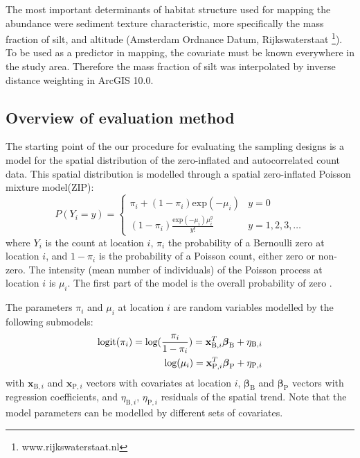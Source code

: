 \documentclass[review]{elsarticle}
\newcommand{\xbf}{\ensuremath{\mathbf x}}
\begin{document}
The most important determinants of habitat structure used for mapping the abundance were sediment texture characteristic, more specifically the mass fraction of silt, and altitude (Amsterdam Ordnance Datum, Rijkswaterstaat \footnote{www.rijkswaterstaat.nl}). To be used as a predictor in mapping, the covariate must be known everywhere in the study area. Therefore the mass fraction of silt was interpolated by inverse distance weighting in ArcGIS 10.0. 

\subsection{Overview of evaluation method}
The starting point of the our procedure for evaluating the sampling designs is a model for the spatial distribution of the zero-inflated and autocorrelated count data. This spatial distribution is modelled through a spatial zero-inflated Poisson mixture model(ZIP)\citep{lambert1992, agarwal2002}:
\begin{equation}
    P(Y_i=y)=
\begin{cases}
\pi_i+(1-\pi_i)\text{exp}(-\mu_i) & y=0 \\
(1-\pi_i)\frac{\text{exp}(-\mu_i)\mu_i^{y}}{y!}& y=1,2,3,\ldots
\end{cases}
\end{equation}
where $Y_i$ is the count at location $i$, $\pi_i$ the probability of a Bernoulli zero at location $i$, and $1-\pi_i$ is the probability of a Poisson count, either zero or non-zero. The intensity (mean number of individuals) of the Poisson process at location $i$ is $\mu_i$. The first part of the model is the overall probability of zero \citep{hilbe2007}.

The parameters $\pi_i$ and $\mu_i$ at location $i$ are random variables modelled by the following submodels:
\begin{eqnarray} \label{eq:glsm}
\text{logit}(\pi_{i})=\text{log}(\frac{\pi_{i}}{1-\pi_{i}})=\xbf_{\mathrm{B},i}^{T}\boldsymbol{\beta}_{\rm{B}} + \eta_{\mathrm{B},i} \nonumber \\
\text{log}(\mu_i)=\xbf_{\mathrm{P},i}^{T}\boldsymbol{\beta}_{\rm{P}} + \eta_{\mathrm{P},i}
\end{eqnarray}
with $\xbf_{\mathrm{B},i}$ and $\xbf_{\mathrm{P},i}$ vectors with covariates at location $i$, $\boldsymbol{\beta}_{\mathrm{B}}$ and $\boldsymbol{\beta}_{\mathrm{P}}$ vectors with regression coefficients, and $\eta_{\mathrm{B},i}$, $\eta_{\mathrm{P},i}$ residuals of the spatial trend. Note that the model parameters can be modelled by different sets of covariates.
\end{document}
